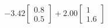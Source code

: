\documentclass[preview]{standalone}
\begin{document}
\begin{align*}
-3.42 \begin{bmatrix} 0.8 \\ 0.5 \end{bmatrix} + 2.00 \begin{bmatrix} 1 \\ 1.6 \end{bmatrix}
\end{align*}
\end{document}
